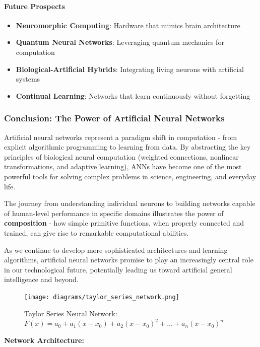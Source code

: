 \paragraph{Future Prospects}

\begin{itemize}
\item \textbf{Neuromorphic Computing}: Hardware that mimics brain architecture
\item \textbf{Quantum Neural Networks}: Leveraging quantum mechanics for computation
\item \textbf{Biological-Artificial Hybrids}: Integrating living neurons with artificial systems
\item \textbf{Continual Learning}: Networks that learn continuously without forgetting
\end{itemize}

\subsubsection{Conclusion: The Power of Artificial Neural Networks}

Artificial neural networks represent a paradigm shift in computation - from explicit algorithmic programming to learning from data. By abstracting the key principles of biological neural computation (weighted connections, nonlinear transformations, and adaptive learning), ANNs have become one of the most powerful tools for solving complex problems in science, engineering, and everyday life.

The journey from understanding individual neurons to building networks capable of human-level performance in specific domains illustrates the power of \textbf{composition} - how simple primitive functions, when properly connected and trained, can give rise to remarkable computational abilities.

As we continue to develop more sophisticated architectures and learning algorithms, artificial neural networks promise to play an increasingly central role in our technological future, potentially leading us toward artificial general intelligence and beyond.

\begin{figure}[h!]
\centering
\texttt{[image: diagrams/taylor\_series\_network.png]}
\caption{Taylor Series Neural Network: $F(x) = a_0 + a_1(x - x_0) + a_2(x - x_0)^2 + \ldots + a_n(x - x_0)^n$}
\end{figure}

\textbf{Network Architecture:}

